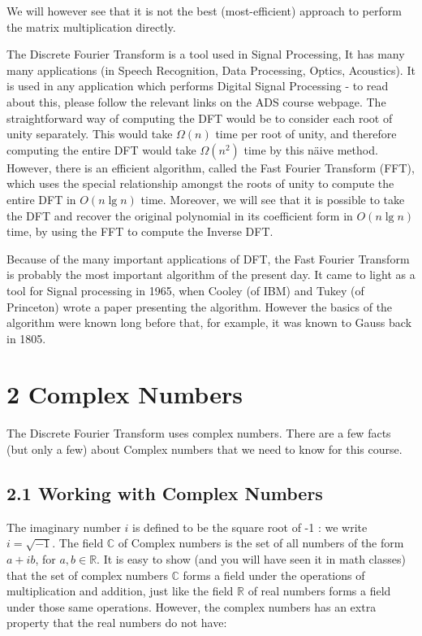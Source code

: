 We will however see that it is not the best (most-efficient) approach to perform the matrix multiplication directly.

The Discrete Fourier Transform is a tool used in Signal Processing, It has many many applications (in Speech Recognition, Data Processing, Optics, Acoustics). It is used in any application which performs Digital Signal Processing - to read about this, please follow the relevant links on the ADS course webpage. The straightforward way of computing the DFT would be to consider each root of unity separately. This would take $\Omega(n)$ time per root of unity, and therefore computing the entire DFT would take $\Omega\left(n^{2}\right)$ time by this näive method. However, there is an efficient algorithm, called the Fast Fourier Transform (FFT), which uses the special relationship amongst the roots of unity to compute the entire DFT in $O(n \lg n)$ time. Moreover, we will see that it is possible to take the DFT and recover the original polynomial in its coefficient form in $O(n \lg n)$ time, by using the FFT to compute the Inverse DFT.

Because of the many important applications of DFT, the Fast Fourier Transform is probably the most important algorithm of the present day. It came to light as a tool for Signal processing in 1965, when Cooley (of IBM) and Tukey (of Princeton) wrote a paper presenting the algorithm. However the basics of the algorithm were known long before that, for example, it was known to Gauss back in 1805.

\section*{2 Complex Numbers}
The Discrete Fourier Transform uses complex numbers. There are a few facts (but only a few) about Complex numbers that we need to know for this course.

\subsection*{2.1 Working with Complex Numbers}
The imaginary number $i$ is defined to be the square root of -1 : we write $i=\sqrt{-1}$. The field $\mathbb{C}$ of Complex numbers is the set of all numbers of the form $a+i b$, for $a, b \in \mathbb{R}$. It is easy to show (and you will have seen it in math classes) that the set of complex numbers $\mathbb{C}$ forms a field under the operations of multiplication and addition, just like the field $\mathbb{R}$ of real numbers forms a field under those same operations. However, the complex numbers has an extra property that the real numbers do not have:

